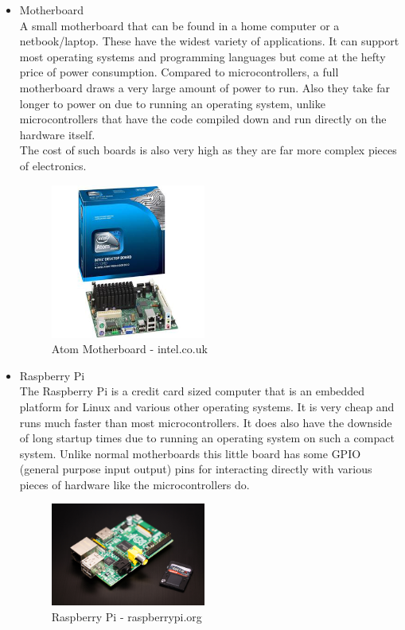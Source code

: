 \begin{itemize}
\item Motherboard
\\A small motherboard that can be found in a home computer or a netbook/laptop.  These have the widest variety of applications.  It can support most operating systems and programming languages but come at the hefty price of power consumption.  Compared to microcontrollers, a full motherboard draws a very large amount of power to run.  Also they take far longer to power on due to running an operating system, unlike microcontrollers that have the code compiled down and run directly on the hardware itself.
\\The cost of such boards is also very high as they are far more complex pieces of electronics.
\begin{figure}[h]
\centering
        \includegraphics[width=2.0in] {Images/atom.jpg}
        \caption{Atom Motherboard - intel.co.uk}
        \label{Atom Motherboard}
\end{figure}
\item Raspberry Pi
\\The Raspberry Pi is a credit card sized computer that is an embedded platform for Linux and various other operating systems.  It is very cheap and runs much faster than most microcontrollers.  It does also have the downside of long startup times due to running an operating system on such a compact system.  Unlike normal motherboards this little board has some GPIO (general purpose input output) pins for interacting directly with various pieces of hardware like the microcontrollers do.
\begin{figure}[h]
\centering
        \includegraphics[width=2.0in] {Images/rpi.jpeg}
        \caption{Raspberry Pi - raspberrypi.org}
        \label{Raspberry Pi}
\end{figure}

\end{itemize}

